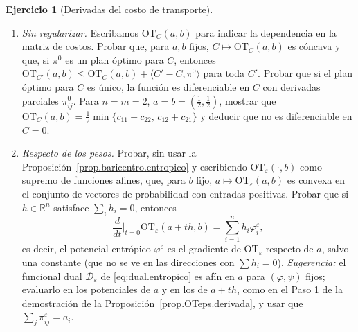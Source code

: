 \documentclass[12pt, a4paper]{amsbook}
\newcommand{\ve}{\varepsilon}
\newcommand{\R}{{\mathbb R}}
\theoremstyle{remark}
\theoremstyle{definition}
\newtheorem{ejercicio}{Ejercicio}[chapter]
\numberwithin{section}{chapter}
\numberwithin{subsection}{section}
\numberwithin{equation}{section}
\numberwithin{figure}{chapter}
\begin{document}
\begin{ejercicio}[Derivadas del costo de transporte]\label{ejer.OTeps.derivadas}
\leavevmode
\begin{enumerate}[label=(\alph*)]
\item \emph{Sin regularizar.} Escribamos $\mathrm{OT}_C(a,b)$ para indicar la
dependencia en la matriz de costos. Probar que, para $a,b$ fijos,
$C\mapsto\mathrm{OT}_C(a,b)$ es cóncava y que, si $\pi^0$ es un plan óptimo para $C$,
entonces $\mathrm{OT}_{C'}(a,b)\le\mathrm{OT}_C(a,b)+\langle C'-C,\pi^0\rangle$
para toda $C'$. Probar que si el plan óptimo para $C$ es único, la función es
diferenciable en $C$ con derivadas parciales $\pi^0_{ij}$. Para $n=m=2$,
$a=b=(\frac12,\frac12)$, mostrar que
$\mathrm{OT}_C(a,b)=\frac12\min\{c_{11}+c_{22},\,c_{12}+c_{21}\}$ y deducir que
no es diferenciable en $C=0$.
\item \emph{Respecto de los pesos.} Probar, sin usar la
Proposición~\ref{prop.baricentro.entropico} y escribiendo
$\mathrm{OT}_\ve(\cdot,b)$ como supremo de funciones afines, que, para $b$
fijo, $a\mapsto\mathrm{OT}_\ve(a,b)$ es convexa en el conjunto de vectores de
probabilidad con entradas positivas. Probar que si $h\in\R^n$ satisface
$\sum_ih_i=0$, entonces
\[
\frac{d}{dt}\Big|_{t=0}\mathrm{OT}_\ve(a+th,b)=\sum_{i=1}^nh_i\varphi^\ve_i,
\]
es decir, el potencial entrópico $\varphi^\ve$ es el gradiente de
$\mathrm{OT}_\ve$ respecto de $a$, salvo una constante (que no se ve en las
direcciones con $\sum h_i=0$). \emph{Sugerencia:} el funcional dual
$\mathcal D_\ve$ de \eqref{eq:dual.entropico} es afín en $a$ para
$(\varphi,\psi)$ fijos; evaluarlo en los potenciales de $a$ y en los de
$a+th$, como en el Paso 1 de la demostración de la
Proposición~\ref{prop.OTeps.derivada}, y usar que $\sum_j\pi^\ve_{ij}=a_i$.
\end{enumerate}
\end{ejercicio}
\end{document}
